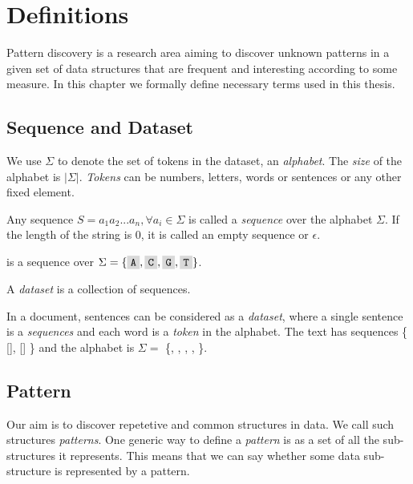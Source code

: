 \chapter{Definitions}
\label{c:definitions}

Pattern discovery is a research area aiming to discover unknown patterns in a given set of data structures that are frequent and interesting according to some measure. In this chapter we formally define necessary terms used in this thesis.

\section{Sequence and Dataset}

We use $\Sigma$ to denote the set of tokens in the dataset, an \emph{alphabet}. The \emph{size} of the alphabet is $|\Sigma|$. \emph{Tokens} can be numbers, letters, words or sentences or any other fixed element.

Any sequence $S=a_1 a_2 ... a_n, \forall a_i \in \Sigma$ is called a \emph{sequence} over the alphabet $\Sigma$. If the length of the string is $0$, it is called an empty sequence or $\epsilon$.

\begin{exmp}
 is a sequence over $\Sigma = \{\R{A}, \R{C}, \R{G}, \R{T}\}$.
\end{exmp}

A \emph{dataset} is a collection of sequences.

\begin{exmp}
In a document, sentences can be considered as a \emph{dataset}, where a single sentence is a \emph{sequences} and each word is a \emph{token} in the alphabet. The text  has sequences \{ [], [] \} and the alphabet is $\Sigma =$ \{, , , , \}.	
\end{exmp}

\section{Pattern}

Our aim is to discover repetetive and common structures in data. We call such structures \emph{patterns}. One generic way to define a \emph{pattern} is as a set of all the sub-structures it represents. This means that we can say whether some data sub-structure is represented by a pattern.

